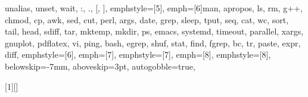 {{         %
         unalias, unset, wait, :, ., [, ]},
emphstyle=[5]{\color{builtins-color}}, %
emph=[6]{man, apropos, ls, rm, g++, chmod, cp, awk, sed, cut, perl, args, date, grep, sleep, tput, seq, cat, wc, sort, tail,
         head, sdiff, tar, mktemp, mkdir, ps, emacs, systemd, timeout, parallel, xargs, gnuplot, pdflatex, vi, ping, bash,
         egrep, shuf, stat, find, fgrep, bc, tr, paste, expr, diff},
emphstyle=[6]{\color{external-color}}, %
emph=[7]{},
emphstyle=[7]{\color{variables-color}}, %
emph=[8]{},
emphstyle=[8]{\color{builtins-color}}, %
%
belowskip=-7mm,
aboveskip=3pt,
autogobble=true, %
}

[1][] %
    {\lstset{style=MyBash, #1}}
    {}

\def\bash{\lstinline[style=MyBash, basicstyle=\ttfamily\color{black}]}


